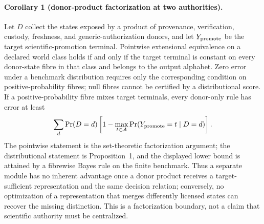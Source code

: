 \paragraph{Corollary 1 (donor-product factorization at two authorities).}
Let $D$ collect the states exposed by a product of provenance, verification,
custody, freshness, and generic-authorization donors, and let $Y_{\rm promote}$
be the target scientific-promotion terminal. Pointwise extensional equivalence
on a declared world class holds if and only if the target terminal is constant
on every donor-state fibre in that class and belongs to the output alphabet.
Zero error under a benchmark distribution requires only the corresponding
condition on positive-probability fibres; null fibres cannot be certified by a
distributional score. If a positive-probability fibre mixes target terminals,
every donor-only rule has error at least
\begin{equation}
  \sum_d \Pr(D=d)
  \left[1-\max_{t\in\mathcal{A}}
  \Pr(Y_{\rm promote}=t\mid D=d)\right].
  \label{eq:mixed-fibre-bound}
\end{equation}
The pointwise statement is the set-theoretic factorization argument; the
distributional statement is Proposition~1, and the displayed lower bound is
attained by a fibrewise Bayes rule on the finite benchmark. Thus a separate module has no inherent advantage once a donor product receives
a target-sufficient representation and the same decision relation; conversely,
no optimization of a representation that merges differently licensed states
can recover the missing distinction.  This is a factorization boundary, not a
claim that scientific authority must be centralized.

